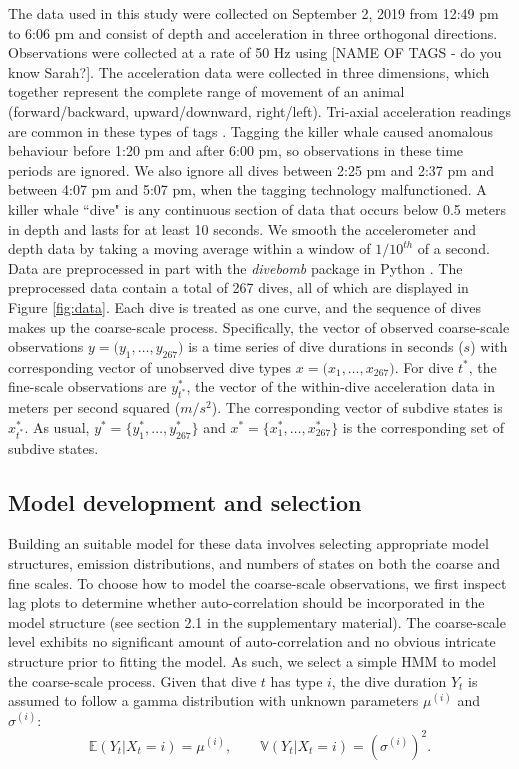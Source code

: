 The data used in this study were collected on September 2, 2019 from 12:49 pm to 6:06 pm and consist of depth and acceleration in three orthogonal directions. Observations were collected at a rate of 50 Hz using
[NAME OF TAGS - do you know Sarah?]. The acceleration data were collected in three dimensions, which together represent the complete range of movement of an animal (forward/backward, upward/downward, right/left). Tri-axial acceleration readings are common in these types of tags \citep{Cade:2017,Fehlmann:2017,Wright:2017}. Tagging the killer whale caused anomalous behaviour before 1:20 pm and after 6:00 pm, so observations in these time periods are ignored. We also ignore all dives between 2:25 pm and 2:37 pm and between 4:07 pm and 5:07 pm, when the tagging technology malfunctioned. A killer whale ``dive" is any continuous section of data that occurs below 0.5 meters in depth and lasts for at least 10 seconds. We smooth the accelerometer and depth data by taking a moving average within a window of $1/10^{th}$ of a second. Data are preprocessed in part with the \textit{divebomb} package in Python \citep{Nunes:2018}. The preprocessed data contain a total of 267 dives, all of which are displayed in Figure \ref{fig:data}. Each dive is treated as one curve, and the sequence of dives makes up the coarse-scale process. Specifically, the vector of observed coarse-scale observations $y = \Big(y_1,\ldots,y_{267}\Big)$ is a time series of dive durations in seconds ($s$) with corresponding vector of unobserved dive types $x = \Big(x_1,\ldots,x_{267}\Big)$. For dive $t^*$, the fine-scale observations are $y^*_{t^*}$, the vector of the within-dive acceleration data in meters per second squared ($m/s^2$).  The corresponding vector of subdive states is $x_{t^*}^*$.  As usual, $y^* = \Big\{y^*_1,\ldots,y^*_{267}\Big\}$ and $x^* = \Big\{x^*_1,\ldots,x^*_{267}\Big\}$ is the corresponding set of subdive states.

\subsection{Model development and selection}

Building an suitable model for these data involves selecting appropriate model structures, emission distributions, and numbers of states on both the coarse and fine scales. To choose how to model the coarse-scale observations, we first inspect lag plots to determine whether auto-correlation should be incorporated in the model structure (see section 2.1 in the supplementary material). The coarse-scale level exhibits no significant amount of auto-correlation and no obvious intricate structure prior to fitting the model. As such, we select a simple HMM to model the coarse-scale process.
Given that dive $t$ has type $i$, the dive duration $Y_t$ is assumed to follow a gamma distribution with unknown parameters $\mu^{(i)}$ and $\sigma^{(i)}$:
%
$$\mathbb{E}(Y_t|X_t = i) = \mu^{(i)}, \qquad \mathbb{V}(Y_t|X_t = i) = \left(\sigma^{(i)}\right)^2.$$

